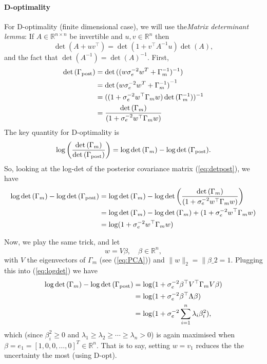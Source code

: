 \documentclass[pdflatex,sn-mathphys-num]{sn-jnl}
\theoremstyle{thmstyleone}%
\theoremstyle{thmstyletwo}%
\theoremstyle{thmstylethree}%
\begin{document}
\paragraph{D-optimality}
For D-optimality (finite dimensional case), we will use  the{\em Matrix determinant lemma}: If $A\in\mathbb{R}^{n\times n}$ be invertible and $u,v\in\mathbb{R}^n$ then
    \[\det{(A+uv^\top)}=\det{(1+v^\top A^{-1} u)}\det{(A)},\] 
 and the fact that $\det(A^{-1})=\det(A)^{-1}$.
 First,
\begin{align}
   \det{(\Gamma_{\rm post})}&=\det{((w\sigma_e^{-2}w^T+\Gamma_m^{-1})^{-1})}\nonumber\\
&=\det{(w\sigma_e^{-2}w^T+\Gamma_m^{-1})}^{-1}\nonumber\\
   &=((1+\sigma_e^{-2}w^\top\Gamma_m w)\det{(\Gamma_m^{-1})})^{-1}\nonumber\\
   &=\frac{\det{(\Gamma_m)}}{(1+\sigma_e^{-2}w^\top\Gamma_m w)}\label{eq:detpost}
\end{align}
The key quantity for D-optimality is 
\[\log{\left(\frac{\det{(\Gamma_m)}}{\det{(\Gamma_{\rm post})}}\right)}=\log\det{(\Gamma_m)}-\log\det{(\Gamma_{\rm post})}.\]
So, looking at the log-det of the posterior covariance matrix (\ref{eq:detpost}), we have
\begin{align}
\log\det{(\Gamma_m)}-\log\det{(\Gamma_{\rm post})}&=\log\det{(\Gamma_m)}-\log\det{\left(\frac{\det{(\Gamma_m)}}{(1+\sigma_e^{-2}w^\top\Gamma_m w)}\right)}\nonumber\\
&=\log\det{(\Gamma_m)}-\log\det{(\Gamma_m)}+(1+\sigma_e^{-2}w^\top\Gamma_m w)\nonumber\\
&=\log(1+\sigma_e^{-2}w^\top\Gamma_m w)\label{eq:logdet}
\end{align}

Now, we play the same trick, and let 
\[w=V\beta,\quad \beta\in\mathbb{R}^n,\]
with $V$ the eigenvectors of $\Gamma_m$ (see (\ref{eq:PCA})) and $\|w\|_2=\|\beta\_2=1.$ Plugging this into (\ref{eq:logdet}) we have 
\begin{align}
   \log\det{(\Gamma_m)}-\log\det{(\Gamma_{\rm post})}&=\log(1+\sigma_e^{-2}\beta^\top V^\top\Gamma_m V\beta)\nonumber\\
   &=\log(1+\sigma_e^{-2}\beta^\top\Lambda\beta)\nonumber\\
   &=\log(1+\sigma_e^{-2}\sum_{i=1}^n\lambda_i\beta_i^2),\nonumber
\end{align}
which (since $\beta_i^2\geq0$ and $\lambda_1\geq\lambda_2\geq\cdots\geq\lambda_n>0$) is again maximised when $\beta=e_1=[1,0,0,\dots,0]^T\in\mathbb{R}^n$. That is to say, setting $w=v_1$ reduces the the uncertainty the most (using D-opt).






\end{document}
